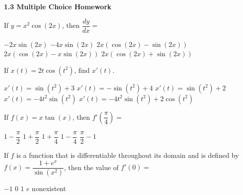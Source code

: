 \textbf{\large{1.3 Multiple Choice Homework}} \par

\begin{questions}
    \question If $y = x^2\cos (2x)$, then $\dfrac{dy}{dx} = $ \\

    \begin{oneparchoices}
        \choice $-2x\sin (2x)$
        \choice $-4x\sin (2x)$
        \choice $2x\left(\cos (2x) - \sin (2x)\right)$ \\[11pt]
        \makebox[0.17 \textwidth] \choice $2x\left(\cos (2x) - x\sin (2x)\right)$
        \makebox[0.2 \textwidth] \choice $2x\left(\cos (2x) + \sin (2x)\right)$
    \end{oneparchoices} \par \horizontalline

    \question If $x(t) = 2t\cos \left(t^2\right)$, find $x'(t)$. \\

    \begin{oneparchoices}
        \choice $x'(t) = \sin \left(t^2\right) + 3$
        \choice $x'(t) = -\sin \left(t^2\right) + 4$ 
        \choice $x'(t) = \sin \left(t^2\right) + 2$ \\[11pt]
        \makebox[0.14 \textwidth] \choice $x'(t) = -4t^2\sin \left(t^2\right)$ 
        \makebox[0.15 \textwidth] \choice $x'(t) = -4t^2\sin \left(t^2\right) + 2\cos \left(t^2\right)$ 
    \end{oneparchoices} \par \horizontalline

    \question If $f(x) = x\tan (x)$, then $f'\left(\dfrac{\pi}{4}\right) = $ \\

    \begin{oneparchoices}
        \choice $1 - \dfrac{\pi}{2}$ 
        \choice $1 + \dfrac{\pi}{2}$
        \choice $1 + \dfrac{\pi}{4}$
        \choice $1 - \dfrac{\pi}{4}$ 
        \choice $\dfrac{\pi}{2} - 1$
    \end{oneparchoices} \par \horizontalline

    \question If $f$ is a function that is differentiable throughout its domain and is defined by $f(x) = \dfrac{1 + e^x}{\sin \left(x^2\right)}$, then the value of $f'(0) = $ \\

    \begin{oneparchoices}
        \choice $-1$ 
        \choice $0$
        \choice $1$
        \choice $e$
        \choice nonexistent
    \end{oneparchoices} \par \horizontalline
    

\end{questions}
